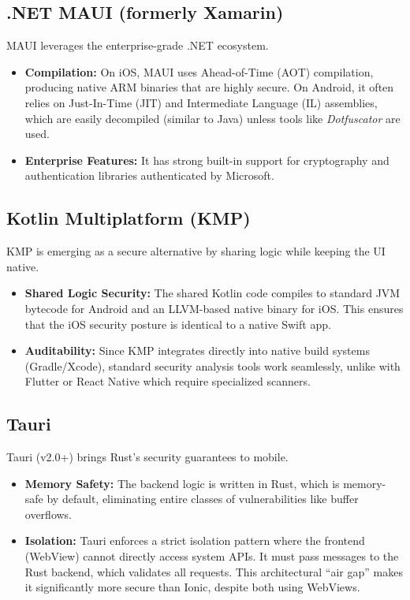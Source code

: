 \subsection{.NET MAUI (formerly Xamarin)}
MAUI leverages the enterprise-grade .NET ecosystem.
\begin{itemize}
    \item \textbf{Compilation:} On iOS, MAUI uses Ahead-of-Time (AOT) compilation, producing native ARM binaries that are highly secure. On Android, it often relies on Just-In-Time (JIT) and Intermediate Language (IL) assemblies, which are easily decompiled (similar to Java) unless tools like \textit{Dotfuscator} are used.
    \item \textbf{Enterprise Features:} It has strong built-in support for cryptography and authentication libraries authenticated by Microsoft.
\end{itemize}

\subsection{Kotlin Multiplatform (KMP)}
KMP is emerging as a secure alternative by sharing logic while keeping the UI native.
\begin{itemize}
    \item \textbf{Shared Logic Security:} The shared Kotlin code compiles to standard JVM bytecode for Android and an LLVM-based native binary for iOS. This ensures that the iOS security posture is identical to a native Swift app.
    \item \textbf{Auditability:} Since KMP integrates directly into native build systems (Gradle/Xcode), standard security analysis tools work seamlessly, unlike with Flutter or React Native which require specialized scanners.
\end{itemize}

\subsection{Tauri}
Tauri (v2.0+) brings Rust's security guarantees to mobile.
\begin{itemize}
    \item \textbf{Memory Safety:} The backend logic is written in Rust, which is memory-safe by default, eliminating entire classes of vulnerabilities like buffer overflows.
    \item \textbf{Isolation:} Tauri enforces a strict isolation pattern where the frontend (WebView) cannot directly access system APIs. It must pass messages to the Rust backend, which validates all requests. This architectural ``air gap'' makes it significantly more secure than Ionic, despite both using WebViews.
\end{itemize}

